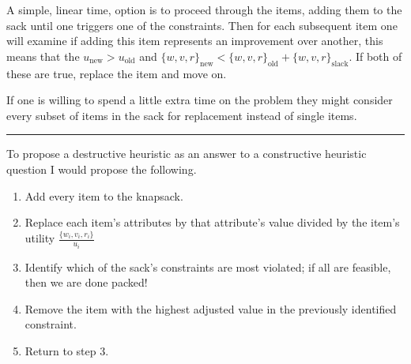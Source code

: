 \documentclass[12pt,letterpaper]{exam}
\begin{document}
\begin{questions}
		
		\begin{solution}
			A simple, linear time, option is to proceed through the items, adding them to the sack until one triggers one of the constraints.
			Then for each subsequent item one will examine if adding this item represents an improvement over another,
			this means that the \(u_{\text{new}}> u_{\text{old}}\) and \(\{w, v, r\}_{\text{new}} < \{w, v, r\}_{\text{old}} + \{w, v, r\}_{\text{slack}} \).
			If both of these are true, replace the item and move on. 
			
			If one is willing to spend a little extra time on the problem they might consider every subset of items in the sack for replacement instead of
			single items. \\
			
			\hrule
			
			To propose a destructive heuristic as an answer to a constructive heuristic question I would propose the following.
			\begin{enumerate}
				\item Add every item to the knapsack.
				\item Replace each item's attributes by that attribute's value divided by the item's utility \(\frac{\{w_i, v_i, r_i\}}{u_i}\)
				\item Identify which of the sack's constraints are most violated; if all are feasible, then we are done packed!
				\item Remove the item with the highest adjusted value in the previously identified constraint.
				\item Return to step 3.
			\end{enumerate}		
			
		\end{solution}
		
	\end{questions}
\end{document}
